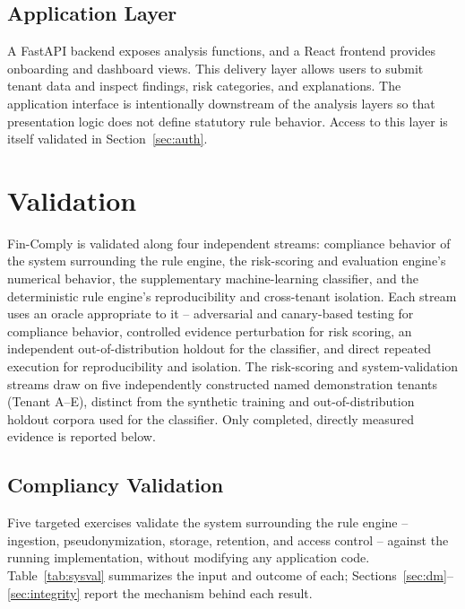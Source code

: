 \documentclass[11pt,a4paper]{article}
\newcommand{\system}{Fin-Comply}
\begin{document}
\subsection{Application Layer}
A FastAPI backend exposes analysis functions, and a React frontend provides onboarding and dashboard views. This delivery layer allows users to submit tenant data and inspect findings, risk categories, and explanations. The application interface is intentionally downstream of the analysis layers so that presentation logic does not define statutory rule behavior. Access to this layer is itself validated in Section~\ref{sec:auth}.

\section{Validation}
\label{sec:validation}
\system{} is validated along four independent streams: compliance behavior of the system surrounding the rule engine, the risk-scoring and evaluation engine's numerical behavior, the supplementary machine-learning classifier, and the deterministic rule engine's reproducibility and cross-tenant isolation. Each stream uses an oracle appropriate to it -- adversarial and canary-based testing for compliance behavior, controlled evidence perturbation for risk scoring, an independent out-of-distribution holdout for the classifier, and direct repeated execution for reproducibility and isolation. The risk-scoring and system-validation streams draw on five independently constructed named demonstration tenants (Tenant A--E), distinct from the synthetic training and out-of-distribution holdout corpora used for the classifier. Only completed, directly measured evidence is reported below.

\subsection{Compliancy Validation}
\label{sec:compliance}
Five targeted exercises validate the system surrounding the rule engine -- ingestion, pseudonymization, storage, retention, and access control -- against the running implementation, without modifying any application code. Table~\ref{tab:sysval} summarizes the input and outcome of each; Sections~\ref{sec:dm}--\ref{sec:integrity} report the mechanism behind each result.
\end{document}
